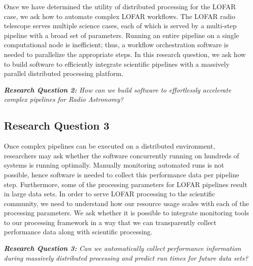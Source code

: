 Once we have determined the utility of distributed processing for the LOFAR case, we ask how to automate complex LOFAR workflows. The LOFAR radio telescope serves multiple science cases, each of which is served by a multi-step pipeline with a broad set of parameters. Running an entire pipeline on a single computational node is inefficient; thus, a workflow orchestration software is needed to parallelize the appropriate steps. In this research question, we ask how to build software to efficiently integrate scientific pipelines with a massively parallel distributed processing platform. 

\begin{addmargin}[4em]{8em}%
    \emph{\textbf{Research Question 2:} How can we build software to effortlessly accelerate complex pipelines for Radio Astronomy?} 
\end{addmargin}


\subsection{Research Question 3}

Once complex pipelines can be executed on a distributed environment, researchers may ask whether the software concurrently running on hundreds of systems is running optimally. Manually monitoring automated runs is not possible, hence software is needed to collect this performance data per pipeline step. Furthermore, some of the processing parameters for LOFAR pipelines result in large data sets. In order to serve LOFAR processing to the scientific community, we need to understand how our resource usage scales with each of the processing parameters. We ask whether it is possible to integrate monitoring tools to our processing framework in a way that we can transparently collect performance data along with scientific processing.     


\begin{addmargin}[4em]{8em}%
    \emph{\textbf{Research Question 3:} Can we automatically collect performance information during massively distributed processing and predict run times for future data sets?}
\end{addmargin}

